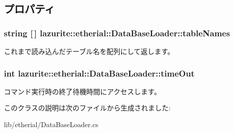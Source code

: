 \subsection{プロパティ}
\hypertarget{classlazurite_1_1etherial_1_1_data_base_loader_a247dd943cfe6c7618ff83dde4170451d}{
\subsubsection[{tableNames}]{\setlength{\rightskip}{0pt plus 5cm}string \mbox{[}$\,$\mbox{]} lazurite::etherial::DataBaseLoader::tableNames}}
\label{classlazurite_1_1etherial_1_1_data_base_loader_a247dd943cfe6c7618ff83dde4170451d}


これまで読み込んだテーブル名を配列にして返します。 \hypertarget{classlazurite_1_1etherial_1_1_data_base_loader_a7400e5d129dc9a8927b1178e484165a4}{
\subsubsection[{timeOut}]{\setlength{\rightskip}{0pt plus 5cm}int lazurite::etherial::DataBaseLoader::timeOut}}
\label{classlazurite_1_1etherial_1_1_data_base_loader_a7400e5d129dc9a8927b1178e484165a4}


コマンド実行時の終了待機時間にアクセスします。 

このクラスの説明は次のファイルから生成されました:\begin{DoxyCompactItemize}
\item 
lib/etherial/DataBaseLoader.cs\end{DoxyCompactItemize}

